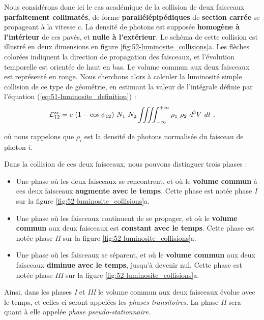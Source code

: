 \begin{refsection}
Nous considérons donc ici le cas académique de la collision de deux faisceaux \textbf{parfaitement collimatés}, de forme \textbf{parallélépipédiques} de \textbf{section carrée} se propageant à la vitesse $c$. La densité de photons est supposée \textbf{homogène à l'intérieur} de ces pavés, et \textbf{nulle à l'extérieur}. Le schéma de cette collision est illustré en deux dimensions en figure \ref{fig:52-luminosite_collisions}a. Les flèches colorées indiquent la direction de propagation des faisceaux, et l'évolution temporelle est orientée de haut en bas. Le volume commun aux deux faisceaux est représenté en rouge. Nous cherchons alors à calculer la luminosité simple collision de ce type de géométrie, en estimant la valeur de l'intégrale définie par l'équation (\ref{eq:51-luminosite_definition}) :
\begin{equation*}
\mathcal{L}_{12}^{sc} = c ~ (1-\cos{\psi_{12}}) ~ N_1 ~ N_2 \iiiint_{-\infty}^{+\infty} \rho_1 ~ \rho_2 ~ d^3 V ~ dt ~ \rm ,
\end{equation*}

où nous rappelons que $\rho_i$ est la densité de photons normalisée du faisceau de photon $i$.

Dans la collision de ces deux faisceaux, nous pouvons distinguer trois phases :
\begin{itemize}
    \item  Une phase où les deux faisceaux se rencontrent, et où le \textbf{volume commun} à ces deux faisceaux \textbf{augmente avec le temps}. Cette phase est notée phase \textit{I} sur la figure \ref{fig:52-luminosite_collisions}a.
    
    \item Une phase où les faisceaux continuent de se propager, et où le \textbf{volume commun} aux deux faisceaux est \textbf{constant avec le temps}. Cette phase est notée phase \textit{II} sur la figure \ref{fig:52-luminosite_collisions}a.

    \item Une phase où les faisceaux se séparent, et où le \textbf{volume commun} aux deux faisceaux \textbf{diminue avec le temps}, jusqu'à devenir nul. Cette phase est notée phase \textit{III} sur la figure \ref{fig:52-luminosite_collisions}a.
\end{itemize}

Ainsi, dans les phases \textit{I} et \textit{III} le volume commun aux deux faisceaux évolue avec le temps, et celles-ci seront appelées les \textit{phases transitoires}. La phase \textit{II} sera quant à elle appelée \textit{phase pseudo-stationnaire}.


\end{refsection}
